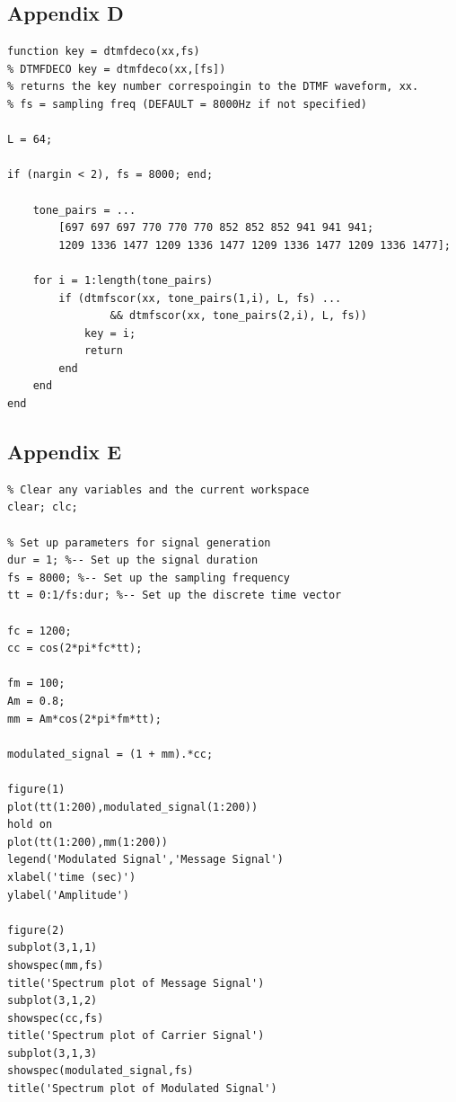 \documentclass{article}
\begin{document}
\hspace{1cm}

\subsection{Appendix D}

\begin{lstlisting}
function key = dtmfdeco(xx,fs)
% DTMFDECO key = dtmfdeco(xx,[fs])
% returns the key number correspoingin to the DTMF waveform, xx.
% fs = sampling freq (DEFAULT = 8000Hz if not specified)

L = 64;

if (nargin < 2), fs = 8000; end;

	tone_pairs = ...
		[697 697 697 770 770 770 852 852 852 941 941 941;
		1209 1336 1477 1209 1336 1477 1209 1336 1477 1209 1336 1477];

	for i = 1:length(tone_pairs)
		if (dtmfscor(xx, tone_pairs(1,i), L, fs) ...
				&& dtmfscor(xx, tone_pairs(2,i), L, fs))
			key = i;
			return
		end
	end
end
\end{lstlisting}

\newpage

\subsection{Appendix E}

\begin{lstlisting}
% Clear any variables and the current workspace
clear; clc;

% Set up parameters for signal generation
dur = 1; %-- Set up the signal duration
fs = 8000; %-- Set up the sampling frequency
tt = 0:1/fs:dur; %-- Set up the discrete time vector

fc = 1200;
cc = cos(2*pi*fc*tt);

fm = 100;
Am = 0.8;
mm = Am*cos(2*pi*fm*tt);

modulated_signal = (1 + mm).*cc;

figure(1)
plot(tt(1:200),modulated_signal(1:200))
hold on
plot(tt(1:200),mm(1:200))
legend('Modulated Signal','Message Signal')
xlabel('time (sec)')
ylabel('Amplitude')

figure(2)
subplot(3,1,1)
showspec(mm,fs)
title('Spectrum plot of Message Signal')
subplot(3,1,2)
showspec(cc,fs)
title('Spectrum plot of Carrier Signal')
subplot(3,1,3)
showspec(modulated_signal,fs)
title('Spectrum plot of Modulated Signal')
\end{lstlisting}
\end{document}
